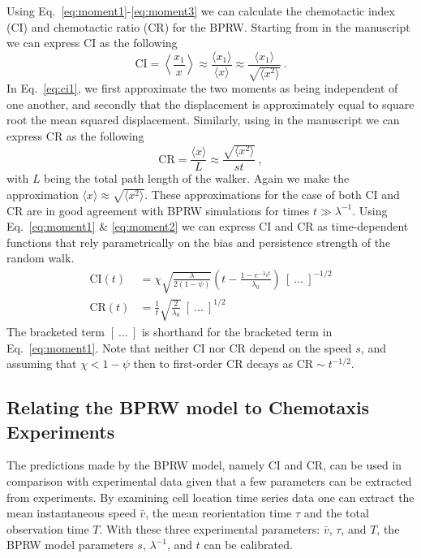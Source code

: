 Using Eq.\ \ref{eq:moment1}-\ref{eq:moment3} we can calculate the chemotactic index (CI) and chemotactic ratio (CR) for the BPRW. Starting from  in the manuscript we can express CI as the following
\begin{equation} \label{eq:ci1}
    \text{CI} = \left\langle \frac{x_1}{x} \right\rangle \approx
    \frac{\langle x_1 \rangle}{\langle x \rangle} \approx
    \frac{\langle x_1 \rangle}{\sqrt{\langle x^2 \rangle}} \ .
\end{equation}
In Eq.\ \ref{eq:ci1}, we first approximate the two moments as being independent of one another, and secondly that the displacement is approximately equal to square root the mean squared displacement. Similarly, using  in the manuscript we can express CR as the following
\begin{equation} \label{eq:cr1}
    \text{CR} = \frac{\langle x \rangle}{L} \approx
    \frac{\sqrt{\langle x^2 \rangle}}{st} \ ,
\end{equation}
with $L$ being the total path length of the walker. Again we make the approximation
$\langle x \rangle \approx \sqrt{\langle x^2 \rangle}$.
These approximations for the case of both CI and CR are in good agreement with BPRW simulations for times $t \gg \lambda^{-1}$. Using Eq.\ \ref{eq:moment1} \& \ref{eq:moment2} we can express CI and CR as time-dependent functions that rely parametrically on the bias and persistence strength of the random walk.
\begin{align} \label{eq:ci2}
    \text{CI}(t) &= \chi \sqrt{\frac{\lambda}{2(1-\psi)}} \left(t -\frac{1-e^{-\lambda_0 t}}{\lambda_0} \right) \
    [ \ \ldots \ ]^{-1/2} \\
    \text{CR}(t) &= \frac{1}{t}\sqrt{\frac{2}{\lambda_0}} \
    [ \ \ldots \ ]^{1/2}
    \label{eq:cr2}
\end{align}
The bracketed term $[ \ \ldots \ ]$ is shorthand for the bracketed term in Eq.\ \ref{eq:moment1}. Note that neither CI nor CR depend on the speed $s$, and assuming that $\chi < 1 - \psi$ then to first-order CR decays as $\text{CR} \sim t^{-1/2}$.


\subsection{Relating the BPRW model to Chemotaxis Experiments}

The predictions made by the BPRW model, namely CI and CR, can be used in comparison with experimental data given that a few parameters can be extracted from experiments. By examining cell location time series data one can extract the mean instantaneous speed $\bar{v}$, the mean reorientation time $\tau$ and the total observation time $T$. With these three experimental parameters:
$\bar{v}$, $\tau$, and $T$,
the BPRW model parameters $s$, $\lambda^{-1}$, and $t$ can be calibrated.

